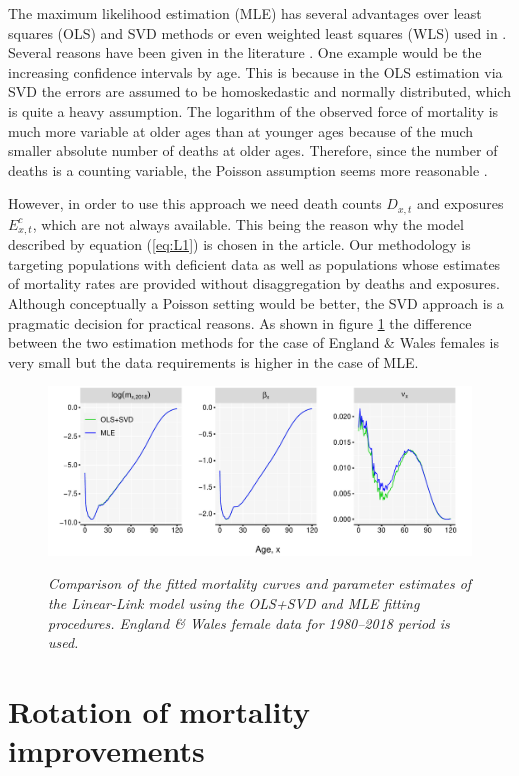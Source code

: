 \documentclass[risks,article,submit,moreauthors,pdftex]{Definitions/mdpi}
\begin{document}
The maximum likelihood estimation (MLE) has several advantages over least squares (OLS) and SVD methods or even weighted least squares (WLS) used in \cite{wilmoth2007}. Several reasons have been given in the literature \citep{brouhns2002, alho2000}. One example would be the increasing confidence intervals by age. This is because in the OLS estimation via SVD the errors are assumed to be homoskedastic and normally distributed, which is quite a heavy assumption. The logarithm of the observed force of mortality is much more variable at older ages than at younger ages because of the much smaller absolute number of deaths at older ages. Therefore, since the number of deaths is a counting variable, the Poisson assumption seems more reasonable \citep{brillinger1986}.
 
However, in order to use this approach we need death counts $D_{x,t}$ and exposures $E_{x,t}^{c}$, which are not always available. This being the reason why the model described by equation (\ref{eq:L1}) is chosen in the article. Our methodology is targeting populations with deficient data as well as populations whose estimates of mortality rates are provided without disaggregation by deaths and exposures. Although conceptually a Poisson setting would be better, the SVD approach is a pragmatic decision for practical reasons. As shown in figure \ref{fig:Figure9} the difference between the two estimation methods for the case of England \& Wales females is very small but the data requirements is higher in the case of MLE.
 
\begin{figure}[H]
{\centering \includegraphics[width=0.9\linewidth]{Figure9-1}}
\caption{\textit{Comparison of the fitted mortality curves and parameter estimates of the Linear-Link model using the OLS+SVD and MLE fitting procedures. England \& Wales female data for 1980--2018 period is used.}}\label{fig:Figure9}
\end{figure}

\section{Rotation of mortality improvements} 
\label{sec:rotateVx}
\end{document}

